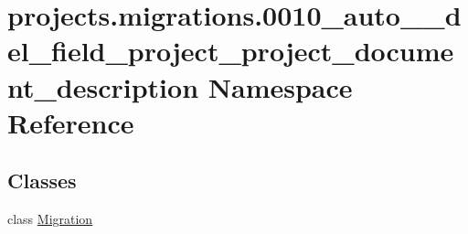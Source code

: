 \hypertarget{namespaceprojects_1_1migrations_1_10010__auto____del__field__project__project__document__description}{\section{projects.\-migrations.0010\-\_\-auto\-\_\-\-\_\-del\-\_\-field\-\_\-project\-\_\-project\-\_\-document\-\_\-description Namespace Reference}
\label{namespaceprojects_1_1migrations_1_10010__auto____del__field__project__project__document__description}
}
\subsection*{Classes}
\begin{DoxyCompactItemize}
\item 
class \hyperlink{classprojects_1_1migrations_1_10010__auto____del__field__project__project__document__description_1_1_migration}{Migration}
\end{DoxyCompactItemize}
